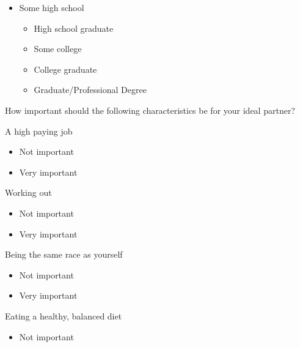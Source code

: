 \documentclass[twoside]{report}
\begin{document}
\begin{multicols*}{2}
\begin{multicols}{2}
\begin{itemize}
\item
  Some high school

  \begin{itemize}
  \item
    High school graduate
  \end{itemize}

  \begin{itemize}
  \item
    Some college
  \item
    College graduate
  \item
    Graduate/Professional Degree
  \end{itemize}
\end{itemize}

How important should the following characteristics be for your ideal
partner?

A high paying job

\begin{itemize}
\item
  Not important
\end{itemize}

\begin{itemize}
\item
  Very important
\end{itemize}

Working out

\begin{itemize}
\item
  Not important
\end{itemize}

\begin{itemize}
\item
  Very important
\end{itemize}

Being the same race as yourself

\begin{itemize}
\item
  Not important
\end{itemize}

\begin{itemize}
\item
  Very important
\end{itemize}

Eating a healthy, balanced diet

\begin{itemize}
\item
  Not important
\end{itemize}


\end{multicols}
\end{multicols*}
\end{document}
